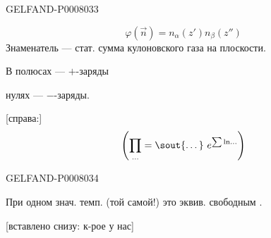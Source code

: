 \begin{GelfandAdjacentEvidence}{GELFAND-P000803}{3}

\[
\varphi(\vec n)=n_\alpha(z')n_\beta(z'')
\]
Знаменатель --- стат. сумма кулоновского газа на плоскости.

В полюсах --- \(+\)-заряды

\hspace{1em}нулях --- \(-\)-заряды.

[справа:]
\[
\left(\prod_{\ldots}=\text{\sout{\ldots}}\ e^{\sum\ln\ldots}\right)
\]
\end{GelfandAdjacentEvidence}
\begin{GelfandAdjacentEvidence}{GELFAND-P000803}{4}


При одном знач. темп. (той самой!) это эквив. свободным .

[вставлено снизу: к-рое у нас]
\end{GelfandAdjacentEvidence}



